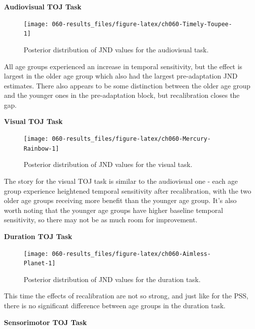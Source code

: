 \documentclass[11pt, oneside, openany]{scrbook}
\begin{document}
\textbf{Audiovisual TOJ Task}

\begin{figure}

{\centering \texttt{[image: 060-results\_files/figure-latex/ch060-Timely-Toupee-1]} 

}

\caption{Posterior distribution of JND values for the audiovisual task.}\label{fig:ch060-Timely-Toupee}
\end{figure}

All age groups experienced an increase in temporal sensitivity, but the effect is largest in the older age group which also had the largest pre-adaptation JND estimates. There also appears to be some distinction between the older age group and the younger ones in the pre-adaptation block, but recalibration closes the gap.

\textbf{Visual TOJ Task}

\begin{figure}

{\centering \texttt{[image: 060-results\_files/figure-latex/ch060-Mercury-Rainbow-1]} 

}

\caption{Posterior distribution of JND values for the visual task.}\label{fig:ch060-Mercury-Rainbow}
\end{figure}

The story for the visual TOJ task is similar to the audiovisual one - each age group experience heightened temporal sensitivity after recalibration, with the two older age groups receiving more benefit than the younger age group. It's also worth noting that the younger age groups have higher baseline temporal sensitivity, so there may not be as much room for improvement.

\textbf{Duration TOJ Task}

\begin{figure}

{\centering \texttt{[image: 060-results\_files/figure-latex/ch060-Aimless-Planet-1]} 

}

\caption{Posterior distribution of JND values for the duration task.}\label{fig:ch060-Aimless-Planet}
\end{figure}

This time the effects of recalibration are not so strong, and just like for the PSS, there is no significant difference between age groups in the duration task.

\textbf{Sensorimotor TOJ Task}
\end{document}
